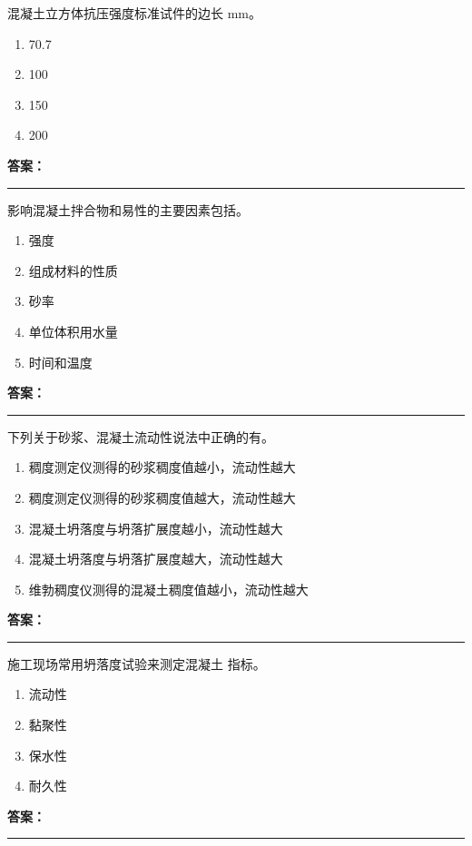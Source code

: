 \documentclass[UTF8,fontset=fandol,11pt]{ctexart}
\newcommand{\answerline}{\textcolor{answerred}{\rule{2.4cm}{0.7pt}}}
\begin{document}
\begin{quizbox}[title={第 53 题}]
混凝土立方体抗压强度标准试件的边长 mm。\\
\begin{enumerate}[label=\Alph*.]
\item 70.7
\item 100
\item 150
\item 200
\end{enumerate}
\textbf{\textcolor{answerred}{答案：}} \answerline
\end{quizbox}

\begin{quizbox}[title={第 54 题}]
影响混凝土拌合物和易性的主要因素包括。\\
\begin{enumerate}[label=\Alph*.]
\item 强度
\item 组成材料的性质
\item 砂率
\item 单位体积用水量
\item 时间和温度
\end{enumerate}
\textbf{\textcolor{answerred}{答案：}} \answerline
\end{quizbox}

\begin{quizbox}[title={第 55 题}]
下列关于砂浆、混凝土流动性说法中正确的有。\\
\begin{enumerate}[label=\Alph*.]
\item 稠度测定仪测得的砂浆稠度值越小，流动性越大
\item 稠度测定仪测得的砂浆稠度值越大，流动性越大
\item 混凝土坍落度与坍落扩展度越小，流动性越大
\item 混凝土坍落度与坍落扩展度越大，流动性越大
\item 维勃稠度仪测得的混凝土稠度值越小，流动性越大
\end{enumerate}
\textbf{\textcolor{answerred}{答案：}} \answerline
\end{quizbox}

\begin{quizbox}[title={第 56 题}]
施工现场常用坍落度试验来测定混凝土 指标。\\
\begin{enumerate}[label=\Alph*.]
\item 流动性
\item 黏聚性
\item 保水性
\item 耐久性
\end{enumerate}
\textbf{\textcolor{answerred}{答案：}} \answerline
\end{quizbox}
\end{document}
